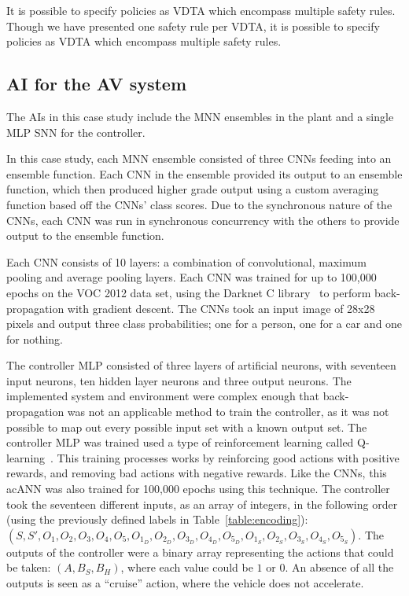 It is possible to specify policies as \ac{VDTA} which encompass multiple safety rules.
Though we have presented one safety rule per \ac{VDTA}, it is possible to specify policies as \ac{VDTA} which encompass multiple safety rules.

\subsection{\acf{AI} for the \acf{AV} system}
The \acp{AI} in this case study include the \ac{MNN} ensembles in the plant and a single \ac{MLP} \ac{SNN} for the controller.

In this case study, each \ac{MNN} ensemble consisted of three \acp{CNN} feeding into an ensemble function.
Each \ac{CNN} in the ensemble provided its output to an ensemble function, which then produced higher grade output using a custom averaging function based off the \acp{CNN}' class scores.
Due to the synchronous nature of the \acp{CNN}, each \ac{CNN} was run in synchronous concurrency with the others to provide output to the ensemble function.
	
Each \ac{CNN} consists of 10 layers: a combination of convolutional, maximum pooling and average pooling layers.
Each \ac{CNN} was trained for up to 100,000 epochs on the \acf{VOC} 2012 data set, using the Darknet C library~\cite{darknet13} to perform back-propagation with gradient descent.
The \acp{CNN} took an input image of 28x28 pixels and output three class probabilities; one for a person, one for a car and one for nothing.

The controller \ac{MLP} consisted of three layers of artificial neurons, with seventeen input neurons, ten hidden layer neurons and three output neurons.
The implemented system and environment were complex enough that back-propagation was not an applicable method to train the controller, as it was not possible to map out every possible input set with a known output set.
The controller \ac{MLP} was trained used a type of reinforcement learning called Q-learning~\cite{qlearning2010}.
This training processes works by reinforcing good actions with positive rewards, and removing bad actions with negative rewards.
Like the \acp{CNN}, this ac{ANN} was also trained for 100,000 epochs using this technique.
The controller took the seventeen different inputs, as an array of integers, in the following order (using the previously defined labels in Table~\ref{table:encoding}): $(S, S', O_1, O_2, O_3, O_4, O_5, O_{1_D}, O_{2_D}, O_{3_D}, O_{4_D}, O_{5_D}, O_{1_S}, O_{2_S}, O_{3_S}, O_{4_S}, O_{5_S})$.
The outputs of the controller were a binary array representing the actions that could be taken: $(A, B_S, B_H)$, where each value could be $1$ or $0$.
An absence of all the outputs is seen as a ``cruise'' action, where the vehicle does not accelerate.

